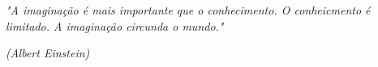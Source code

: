 \begin{epigrafe}

	\vspace*{\fill}
	\begin{flushright}
		\textit{"A imaginação é mais importante que o conhecimento. O conheicmento é limitado. A imaginação circunda o mundo."}   

        \textit{(Albert Einstein)}

	\end{flushright}
\end{epigrafe}